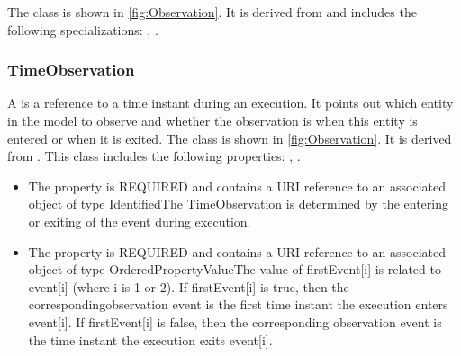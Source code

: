 %
The  class is shown in \ref{fig:Observation}. It is derived from  and includes the following specializations: , . %
%
\subsubsection{TimeObservation}%
\label{sec:uml:TimeObservation}%
A  is a reference to a time instant during an execution. It points out which entity in the model to observe and whether the observation is when this entity is entered or when it is exited.%
\newline%
\linebreak%
The  class is shown in \ref{fig:Observation}. It is derived from .%
This class includes the following properties: , . %
\begin{itemize}%
\item%
The  property is REQUIRED and contains a URI reference to an associated object of type IdentifiedThe TimeObservation is determined by the entering or exiting of the event during execution.%
\item%
The  property is REQUIRED and contains a URI reference to an associated object of type OrderedPropertyValueThe value of firstEvent[i] is related to event[i] (where i is 1 or 2). If firstEvent[i] is true, then the correspondingobservation event is the first time instant the execution enters event[i]. If firstEvent[i] is false, then the corresponding observation event is the time instant the execution exits event[i].%
\end{itemize}%
